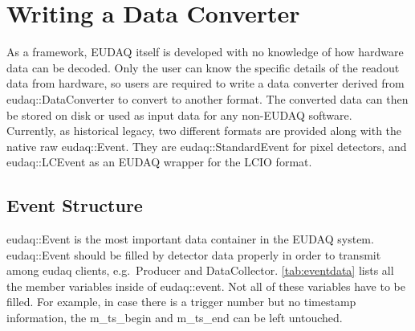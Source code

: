 \section{Writing a Data Converter}\label{sec:DataConverter}
As a framework, EUDAQ itself is developed with no knowledge of how hardware data can be decoded. Only the user can know the specific details of the readout data from hardware, so users are required to write a data converter derived from eudaq::DataConverter to convert to another format. The converted data can then be stored on disk or used as input data for any non-EUDAQ software.\\

Currently, as historical legacy, two different formats are provided along with the native raw eudaq::Event. They are eudaq::StandardEvent for pixel detectors, and eudaq::LCEvent as an EUDAQ wrapper for the LCIO format.

\subsection{Event Structure}
eudaq::Event is the most important data container in the EUDAQ system. eudaq::Event should be filled by detector data properly in order to transmit among eudaq clients, e.g.\ Producer and DataCollector. \autoref{tab:eventdata} lists all the member variables inside of eudaq::event. Not all of these variables have to be filled. For example, in case there is a trigger number but no timestamp information, the m\_ts\_begin and m\_ts\_end can be left untouched.

